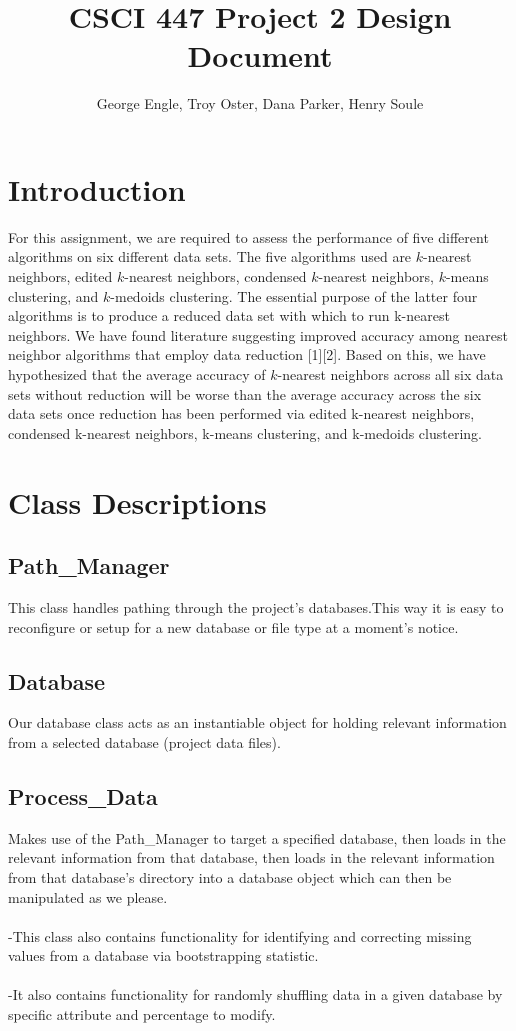 \documentclass{article}
\title{CSCI 447 Project 2 Design Document}
\author{George Engle, Troy Oster, Dana Parker, Henry Soule}
\begin{document}
\maketitle
\section{Introduction}
\quad \quad For this assignment, we are required to assess the performance of five different algorithms on six different data sets. The five algorithms used are $k$-nearest neighbors, edited $k$-nearest neighbors, condensed $k$-nearest neighbors, $k$-means clustering, and $k$-medoids clustering.  The essential purpose of the latter four algorithms is to produce a reduced data set with which to run k-nearest neighbors. We have found literature suggesting improved accuracy among nearest neighbor algorithms that employ data reduction [1][2].  Based on this, we have hypothesized that the average accuracy of $k$-nearest neighbors across all six data sets without reduction will be worse than the average accuracy across the six data sets once reduction has been performed via edited k-nearest neighbors, condensed k-nearest neighbors, k-means clustering, and k-medoids clustering.

\section{Class Descriptions}

\subsection*{Path\_Manager}
\quad \quad This class handles pathing through the project’s databases.This way it is easy to reconfigure or setup for a new database or file type at a moment’s notice.

\subsection*{Database}
\quad \quad  Our database class acts as an instantiable object for holding relevant information from a selected database (project data files).

\subsection*{Process\_Data}
\quad \quad Makes use of the Path\_Manager to target a specified database, then loads in the relevant information from that database, then loads in the relevant information from that database’s directory into a database object which can then be manipulated as we please. \\ \\
-This class also contains functionality for identifying and correcting missing values from a database via bootstrapping statistic. \\ \\
-It also contains functionality for randomly shuffling data in a given database by specific attribute and percentage to modify.
\end{document}
